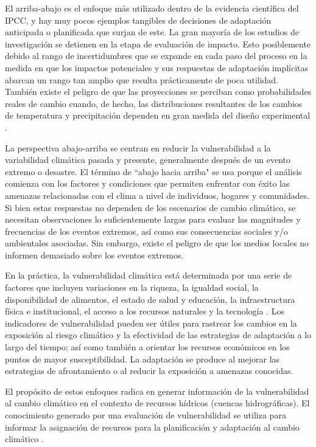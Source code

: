 \documentclass[12pt]{article}
\begin{document}
El arriba-abajo es el enfoque más utilizado dentro de la evidencia científica del IPCC, y hay muy pocos ejemplos tangibles de decisiones de adaptación anticipada o planificada que surjan de este. La gran mayoría de los estudios de investigación se detienen en la etapa de evaluación de impacto. Esto posiblemente debido al rango de incertidumbres que se expande en cada paso del proceso en la medida en que los impactos potenciales y sus respuestas de adaptación implícitas abarcan un rango tan amplio que resulta prácticamente de poca utilidad. También existe el peligro de que las proyecciones se perciban como probabilidades reales de cambio cuando, de hecho, las distribuciones resultantes de los cambios de temperatura y precipitación dependen en gran medida del diseño experimental \citep{Dessai2004}. 



La perspectiva abajo-arriba se centran en reducir la vulnerabilidad a la variabilidad climática pasada y presente, generalmente después de un evento extremo o desastre. El término de “abajo hacia arriba" se usa porque el análisis comienza con los factores y condiciones que permiten enfrentar con éxito las amenazas relacionadas con el clima a nivel de individuos, hogares y comunidades. Si bien estas respuestas no dependen de los escenarios de cambio climático, se necesitan observaciones lo suficientemente largas para evaluar las magnitudes y frecuencias de los eventos extremos, así como sus consecuencias sociales y/o ambientales asociadas. Sin embargo, existe el peligro de que los medios locales no informen demasiado sobre los eventos extremos.

En la práctica, la vulnerabilidad climática está determinada por una serie de factores que incluyen variaciones en la riqueza, la igualdad social, la disponibilidad de alimentos, el estado de salud y educación, la infraestructura física e institucional, el acceso a los recursos naturales y la tecnología \citep{Brooks2005}. Los indicadores de vulnerabilidad pueden ser útiles para rastrear los cambios en la exposición al riesgo climático y la efectividad de las estrategias de adaptación a lo largo del tiempo; así como también a orientar los recursos económicos en los puntos de mayor susceptibilidad. La adaptación se produce al mejorar las estrategias de afrontamiento o al reducir la exposición a amenazas conocidas.

El propósito de estos enfoques radica en generar información de la vulnerabilidad al cambio climático en el contexto de recursos hídricos (cuencas hidrográficas). El conocimiento generado por una evaluación de vulnerabilidad se utiliza para informar la asignación de recursos para la planificación y adaptación al cambio climático \citep{nelitz2013tools,Dessai2004}. 
\end{document}
